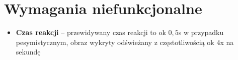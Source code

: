 \documentclass[a4paper]{mwart}
\begin{document}
\section{Wymagania niefunkcjonalne}

\begin{itemize}
	\item \textbf{Czas reakcji} -- przewidywany czas reakcji to ok $0{,}5$s w przypadku pesymistycznym, obraz wykryty odświeżany z częstotliwością ok 4x na sekundę
\end{itemize}


\end{document}
